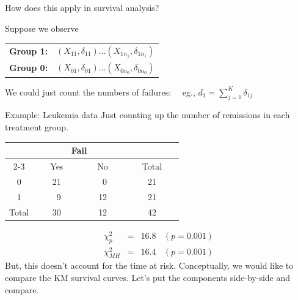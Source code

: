 \documentclass[envcountsect, 10pt, portrait, palatino]{beamer}
\begin{document}
\begin{frame}{ How does this apply in survival analysis?}

Suppose we observe

\begin{tabular}{ll}
{\bf Group 1:} &  $(X_{11},\delta_{11}) \dots (X_{1n_1},\delta_{1n_1})$\\[2ex]
{\bf Group 0:} &  $(X_{01},\delta_{01}) \dots (X_{0n_0},\delta_{0n_0})$\\[2ex]
\end{tabular}

We could just count the numbers of failures:
~~eg., $d_1=\sum_{j=1}^K \delta_{1j}$
\end{frame}
\begin{frame}{Example: Leukemia data}
Just counting up the number of remissions in each treatment group.
\begin{center}
\begin{tabular}{cccc}
\hline \hline
& \multicolumn{2}{c}{Fail} &  \\ \cline{2-3}
\multicolumn{1}{c}{Group } & ~~~Yes~~~ & ~~~No~~~ &  ~~~Total~~~  \\ \hline
0 &  21  &   ~0  & 21        \\
1 &  ~9   &  12  & 21        \\
\hline
Total & 30  & 12 & 42    \\ \hline \hline
\end{tabular}
\end{center}
\begin{eqnarray*}
\chi^2_p & = & 16.8 ~~~~ (p=0.001)\\
\chi^2_{MH} & = & 16.4 ~~~~ (p=0.001)
\end{eqnarray*}
But, this doesn't account for the time at risk. Conceptually, we would like to compare the KM survival curves.
Let's put the components side-by-side and compare.
\end{frame}
\end{document}
